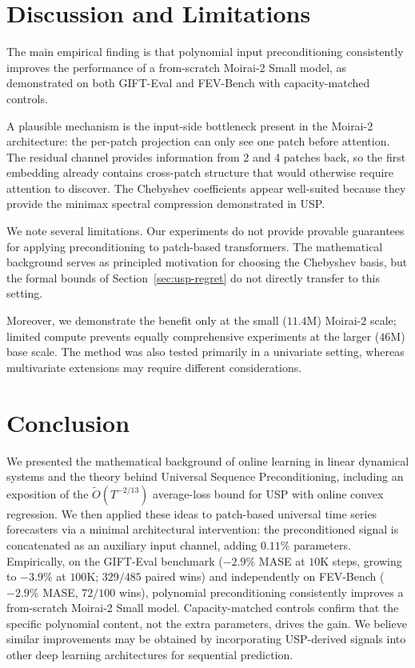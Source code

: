 \documentclass[11pt]{article}
\theoremstyle{plain}
\theoremstyle{definition}
\theoremstyle{remark}
\begin{document}
\section{Discussion and Limitations}
\label{sec:discussion}

The main empirical finding is that polynomial input preconditioning consistently improves the performance of a from-scratch Moirai-2 Small model, as demonstrated on both GIFT-Eval and FEV-Bench with capacity-matched controls.

A plausible mechanism is the input-side bottleneck present in the Moirai-2 architecture: the per-patch projection can only see one patch before attention. The residual channel provides information from 2 and 4 patches back, so the first embedding already contains cross-patch structure that would otherwise require attention to discover. The Chebyshev coefficients appear well-suited because they provide the minimax spectral compression demonstrated in USP.

We note several limitations. Our experiments do not provide provable guarantees for applying preconditioning to patch-based transformers. The mathematical background serves as principled motivation for choosing the Chebyshev basis, but the formal bounds of Section~\ref{sec:usp-regret} do not directly transfer to this setting.

Moreover, we demonstrate the benefit only at the small ($11.4$M) Moirai-2 scale; limited compute prevents equally comprehensive experiments at the larger ($46$M) base scale. The method was also tested primarily in a univariate setting, whereas multivariate extensions may require different considerations.

\section{Conclusion}
We presented the mathematical background of online learning in linear dynamical systems and the theory behind Universal Sequence Preconditioning, including an exposition of the $\tilde O(T^{-2/13})$ average-loss bound for USP with online convex regression. We then applied these ideas to patch-based universal time series forecasters via a minimal architectural intervention: the preconditioned signal is concatenated as an auxiliary input channel, adding $0.11\%$ parameters. Empirically, on the GIFT-Eval benchmark ($-2.9\%$ MASE at $10$K steps, growing to $-3.9\%$ at $100$K; $329/485$ paired wins) and independently on FEV-Bench ($-2.9\%$ MASE, $72/100$ wins), polynomial preconditioning consistently improves a from-scratch Moirai-2 Small model. Capacity-matched controls confirm that the specific polynomial content, not the extra parameters, drives the gain. We believe similar improvements may be obtained by incorporating USP-derived signals into other deep learning architectures for sequential prediction.
\end{document}
